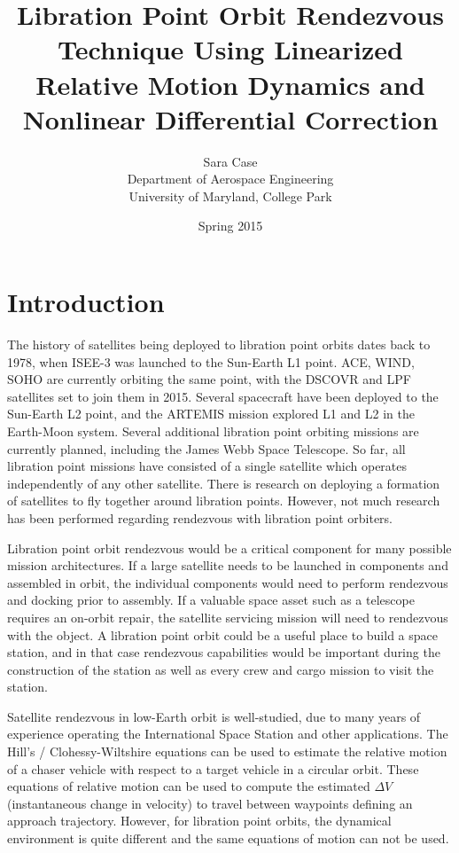 \documentclass[a4paper]{article}
\title{Libration Point Orbit Rendezvous Technique Using Linearized Relative Motion Dynamics and Nonlinear Differential Correction}
\author{Sara Case\\ Department of Aerospace Engineering\\ University of Maryland, College Park}
\date{Spring 2015}
\begin{document}
\maketitle


\section{Introduction}

The history of satellites being deployed to libration point orbits dates back to 1978, when ISEE-3 was launched to the Sun-Earth L1 point. ACE, WIND, SOHO are currently orbiting the same point, with the DSCOVR and LPF satellites set to join them in 2015.  Several spacecraft have been deployed to the Sun-Earth L2 point, and the ARTEMIS mission explored L1 and L2 in the Earth-Moon system.  Several additional libration point orbiting missions are currently planned, including the James Webb Space Telescope.  So far, all libration point missions have consisted of a single satellite which operates independently of any other satellite.  There is research on deploying a formation of satellites to fly together around libration points.  However, not much research has been performed regarding rendezvous with libration point orbiters.  %

Libration point orbit rendezvous would be a critical component for many possible mission architectures.  If a large satellite needs to be launched in components and assembled in orbit, the individual components would need to perform rendezvous and docking prior to assembly.  If a valuable space asset such as a telescope requires an on-orbit repair, the satellite servicing mission will need to rendezvous with the object.  A libration point orbit could be a useful place to build a space station, and in that case rendezvous capabilities would be important during the construction of the station as well as every crew and cargo mission to visit the station. %

Satellite rendezvous in low-Earth orbit is well-studied, due to many years of experience operating the International Space Station and other applications.  The Hill's / Clohessy-Wiltshire equations can be used to estimate the relative motion of a chaser vehicle with respect to a target vehicle in a circular orbit.  These equations of relative motion can be used to compute the estimated \(\Delta V\) (instantaneous change in velocity) to travel between waypoints defining an approach trajectory.  However, for libration point orbits, the dynamical environment is quite different and the same equations of motion can not be used. %
\end{document}
